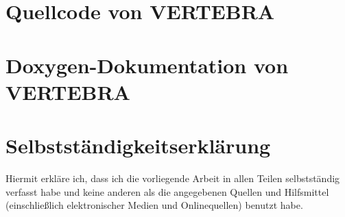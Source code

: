 \documentclass[a4paper,titlepage,12pt]{scrartcl}
\begin{document}
\section{Quellcode von VERTEBRA}
\section{Doxygen-Dokumentation von VERTEBRA}
\section{Selbstständigkeitserklärung}
Hiermit erkläre ich, dass ich die vorliegende Arbeit in allen Teilen selbstständig verfasst habe und keine anderen als die angegebenen Quellen und Hilfsmittel (einschließlich elektronischer Medien und Onlinequellen) benutzt habe.
\newpage
\renewcommand\refname{Literatur- und Quellenverzeichnis}


\end{document}
